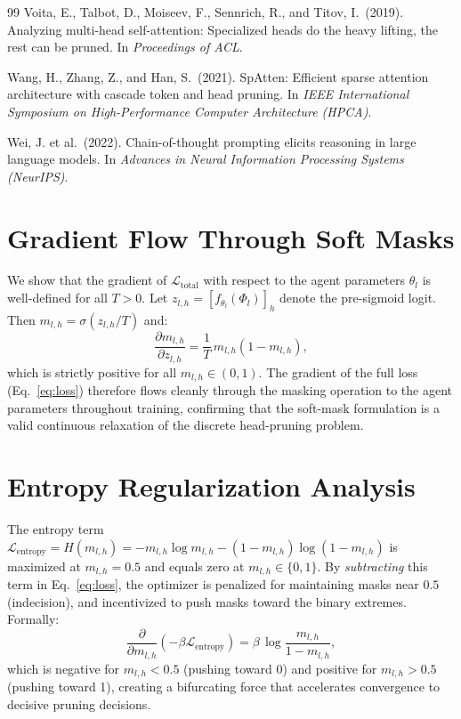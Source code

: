 \documentclass{article}
\newcommand{\Lcal}{\mathcal{L}}
\begin{document}
\begin{thebibliography}{99}
Voita, E., Talbot, D., Moiseev, F., Sennrich, R., and Titov, I.\ (2019).
\newblock Analyzing multi-head self-attention: Specialized heads do the heavy lifting, the rest can be pruned.
\newblock In \emph{Proceedings of ACL}.

Wang, H., Zhang, Z., and Han, S.\ (2021).
\newblock SpAtten: Efficient sparse attention architecture with cascade token and head pruning.
\newblock In \emph{IEEE International Symposium on High-Performance Computer Architecture (HPCA)}.

Wei, J. et al.\ (2022).
\newblock Chain-of-thought prompting elicits reasoning in large language models.
\newblock In \emph{Advances in Neural Information Processing Systems (NeurIPS)}.

\end{thebibliography}

\appendix

\section{Gradient Flow Through Soft Masks}
\label{app:gradients}

We show that the gradient of $\Lcal_{\text{total}}$ with respect to the agent parameters
$\theta_l$ is well-defined for all $T > 0$. Let $z_{l,h} = [f_{\theta_l}(\Phi_l)]_h$ denote
the pre-sigmoid logit. Then $m_{l,h} = \sigma(z_{l,h}/T)$ and:
\[
  \frac{\partial m_{l,h}}{\partial z_{l,h}} = \frac{1}{T}\,m_{l,h}(1 - m_{l,h}),
\]
which is strictly positive for all $m_{l,h} \in (0,1)$. The gradient of the full loss
(Eq.~\ref{eq:loss}) therefore flows cleanly through the masking operation to the agent
parameters throughout training, confirming that the soft-mask formulation is a valid
continuous relaxation of the discrete head-pruning problem.

\section{Entropy Regularization Analysis}
\label{app:entropy}

The entropy term $\Lcal_{\text{entropy}} = H(m_{l,h}) = -m_{l,h}\log m_{l,h}
- (1-m_{l,h})\log(1-m_{l,h})$ is maximized at $m_{l,h} = 0.5$ and equals zero at
$m_{l,h} \in \{0, 1\}$. By \emph{subtracting} this term in Eq.~\eqref{eq:loss},
the optimizer is penalized for maintaining masks near $0.5$ (indecision), and incentivized
to push masks toward the binary extremes. Formally:
\[
  \frac{\partial}{\partial m_{l,h}}(-\beta\Lcal_{\text{entropy}}) =
  \beta\,\log\!\frac{m_{l,h}}{1 - m_{l,h}},
\]
which is negative for $m_{l,h} < 0.5$ (pushing toward 0) and positive for $m_{l,h} > 0.5$
(pushing toward 1), creating a bifurcating force that accelerates convergence to decisive
pruning decisions.
\end{document}
